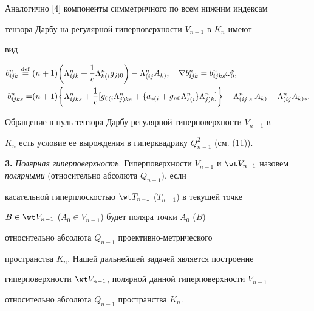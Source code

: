  


Аналогично [4] компоненты симметричного по всем нижним индексам 


тензора Дарбу на регулярной гиперповерхности $V_{n-1}$ в $K_n$ имеют 


вид 


\begin{align} 


b^n_{ijk}\eqdef&(n+1)\bigg(\Lambda^n_{ijk}+\frac{1}{c} 


\Lambda{}^n_{k(i}g{}_{j)0}\bigg)-\Lambda{}^n_{(ij}A{}_{k)},\quad 


\nabla b^n_{ijk}=b^n_{ijks}\omega^s_0,\\ 


% 


b^n_{ijks}=&(n+1)\bigg\{\Lambda^n_{ijks}+\frac{1}{c}[ 


g{}_{0(i}\Lambda{}^n_{j)ks}+\{a{}_{s(i}+g_{n0}\Lambda{}_{s(i}^n\} 


\Lambda{}^n_{j)k}]\bigg\}-\Lambda{}^n_{(ij|s|}A{}_{k)}- 


\Lambda{}^n_{(ij}A{}_{k)s}.\notag 


\end{align} 


 


Обращение в нуль тензора Дарбу регулярной гиперповерхности $V_{n-1}$ в 


$K_n$ есть условие ее вырождения в гиперквадрику $Q^2_{n-1}$ (см. (11)). 


\medskip 


 


{\bf 3.} {\it Полярная гиперповерхность}. Гиперповерхности $V_{n-1}$ и $\wt 


V_{n-1}$ назовем {\it полярными} (относительно абсолюта $Q_{n-1}$), если 


касательной гиперплоскостью $\wt T_{n-1}$ ($T_{n-1}$) в текущей точке 


$B\in\wt V_{n-1}$ ($A_0\in V_{n-1}$) будет поляра точки $A_0$ ($B$) 


относительно абсолюта $Q_{n-1}$ проективно-метрического 


пространства $K_n$. Нашей дальнейшей задачей является построение 


гиперповерхности $\wt V_{n-1}$, полярной данной гиперповерхности $V_{n-1}$ 


относительно абсолюта $Q_{n-1}$ пространства $K_n$. 


